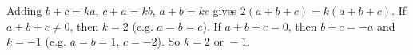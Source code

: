 Adding $b+c=ka$, $c+a=kb$, $a+b=kc$ gives $2(a+b+c)=k(a+b+c)$. If $a+b+c\ne0$, then $k=2$ (e.g. $a=b=c$). If $a+b+c=0$, then $b+c=-a$ and $k=-1$ (e.g. $a=b=1$, $c=-2$). So $k=\boxed{2\text{ or }-1}$.
